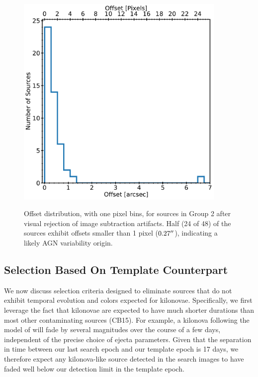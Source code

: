 \begin{figure}[!t]
\begin{center}
\hspace*{-0.1in} 
\scalebox{1.}
{\includegraphics[width=0.9\textwidth]{./figs/chapter3/f1.pdf}}
\caption{Offset distribution, with one pixel bins, for sources in Group 2 after visual rejection of image subtraction artifacts. Half (24 of 48) of the sources exhibit offsets smaller than 1 pixel ($0.27\hbox{$^{\prime\prime}$}$), indicating a likely AGN variability origin.}
\label{fig:offset_hist}
\end{center}
\end{figure}

\subsection{Selection Based On Template Counterpart}
\label{sec:source_cuts}

We now discuss selection criteria designed to eliminate sources that do not exhibit temporal evolution and colors expected for kilonovae. Specifically, we first leverage the fact that kilonovae are expected to have much shorter durations than most other contaminating sources (CB15). For example, a kilonova following the model of \citealt{barnes13} will fade by several magnitudes over the course of a few days, independent of the precise choice of ejecta parameters. Given that the separation in time between our last search epoch and our template epoch is 17 days, we therefore expect any kilonova-like source detected in the search images to have faded well below our detection limit in the template epoch. 

